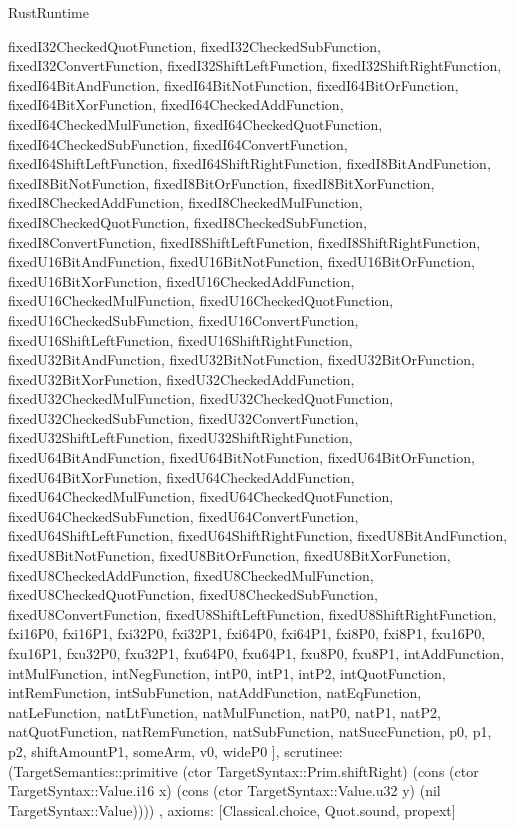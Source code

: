 \begin{lexlean}{RustRuntime}
\begin{semanticmodule}
{{      fixedI32CheckedQuotFunction,
      fixedI32CheckedSubFunction,
      fixedI32ConvertFunction,
      fixedI32ShiftLeftFunction,
      fixedI32ShiftRightFunction,
      fixedI64BitAndFunction,
      fixedI64BitNotFunction,
      fixedI64BitOrFunction,
      fixedI64BitXorFunction,
      fixedI64CheckedAddFunction,
      fixedI64CheckedMulFunction,
      fixedI64CheckedQuotFunction,
      fixedI64CheckedSubFunction,
      fixedI64ConvertFunction,
      fixedI64ShiftLeftFunction,
      fixedI64ShiftRightFunction,
      fixedI8BitAndFunction,
      fixedI8BitNotFunction,
      fixedI8BitOrFunction,
      fixedI8BitXorFunction,
      fixedI8CheckedAddFunction,
      fixedI8CheckedMulFunction,
      fixedI8CheckedQuotFunction,
      fixedI8CheckedSubFunction,
      fixedI8ConvertFunction,
      fixedI8ShiftLeftFunction,
      fixedI8ShiftRightFunction,
      fixedU16BitAndFunction,
      fixedU16BitNotFunction,
      fixedU16BitOrFunction,
      fixedU16BitXorFunction,
      fixedU16CheckedAddFunction,
      fixedU16CheckedMulFunction,
      fixedU16CheckedQuotFunction,
      fixedU16CheckedSubFunction,
      fixedU16ConvertFunction,
      fixedU16ShiftLeftFunction,
      fixedU16ShiftRightFunction,
      fixedU32BitAndFunction,
      fixedU32BitNotFunction,
      fixedU32BitOrFunction,
      fixedU32BitXorFunction,
      fixedU32CheckedAddFunction,
      fixedU32CheckedMulFunction,
      fixedU32CheckedQuotFunction,
      fixedU32CheckedSubFunction,
      fixedU32ConvertFunction,
      fixedU32ShiftLeftFunction,
      fixedU32ShiftRightFunction,
      fixedU64BitAndFunction,
      fixedU64BitNotFunction,
      fixedU64BitOrFunction,
      fixedU64BitXorFunction,
      fixedU64CheckedAddFunction,
      fixedU64CheckedMulFunction,
      fixedU64CheckedQuotFunction,
      fixedU64CheckedSubFunction,
      fixedU64ConvertFunction,
      fixedU64ShiftLeftFunction,
      fixedU64ShiftRightFunction,
      fixedU8BitAndFunction,
      fixedU8BitNotFunction,
      fixedU8BitOrFunction,
      fixedU8BitXorFunction,
      fixedU8CheckedAddFunction,
      fixedU8CheckedMulFunction,
      fixedU8CheckedQuotFunction,
      fixedU8CheckedSubFunction,
      fixedU8ConvertFunction,
      fixedU8ShiftLeftFunction,
      fixedU8ShiftRightFunction,
      fxi16P0,
      fxi16P1,
      fxi32P0,
      fxi32P1,
      fxi64P0,
      fxi64P1,
      fxi8P0,
      fxi8P1,
      fxu16P0,
      fxu16P1,
      fxu32P0,
      fxu32P1,
      fxu64P0,
      fxu64P1,
      fxu8P0,
      fxu8P1,
      intAddFunction,
      intMulFunction,
      intNegFunction,
      intP0,
      intP1,
      intP2,
      intQuotFunction,
      intRemFunction,
      intSubFunction,
      natAddFunction,
      natEqFunction,
      natLeFunction,
      natLtFunction,
      natMulFunction,
      natP0,
      natP1,
      natP2,
      natQuotFunction,
      natRemFunction,
      natSubFunction,
      natSuccFunction,
      p0,
      p1,
      p2,
      shiftAmountP1,
      someArm,
      v0,
      wideP0
    ],
    scrutinee: (TargetSemantics::primitive (ctor TargetSyntax::Prim.shiftRight) (cons (ctor TargetSyntax::Value.i16 x) (cons (ctor TargetSyntax::Value.u32 y) (nil TargetSyntax::Value))))
  },
  axioms: [Classical.choice, Quot.sound, propext]
}


\end{semanticmodule}
\end{lexlean}
